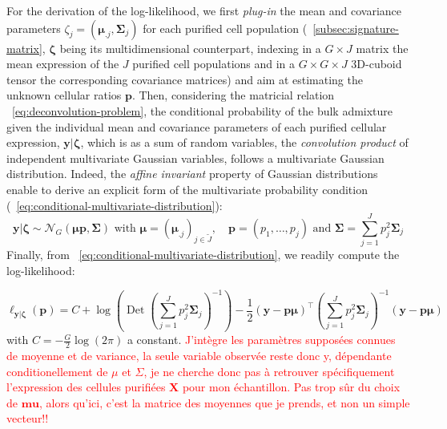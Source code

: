 \documentclass[long, final]{jobim}
\DeclareMathOperator*{\DET}{Det}
\begin{document}
For the derivation of the log-likelihood, we first \textit{plug-in} the mean and covariance parameters $\zeta_j=\left(\boldsymbol{\mu}_{.j}, \boldsymbol{\Sigma}_j\right)$ for each purified cell population (\sectionname~\ref{subsec:signature-matrix}, $\boldsymbol{\zeta}$ being its multidimensional counterpart, indexing in a $G \times J$ matrix the mean expression of the $J$ purified cell populations and in a $G \times G \times J$ 3D-cuboid tensor the corresponding covariance matrices) and aim at estimating the unknown cellular ratios $\boldsymbol{p}$. Then, considering the matricial relation \equationname ~\ref{eq:deconvolution-problem}, the conditional probability of the bulk admixture given the individual mean and covariance parameters of each purified cellular expression, $\boldsymbol{y}|\boldsymbol{\zeta}$, which is as a sum of random variables, the \textit{convolution product} of independent multivariate Gaussian variables, follows a multivariate Gaussian distribution. Indeed, the \textit{affine invariant} property of Gaussian distributions enable to derive an explicit form of the multivariate probability condition (\equationname~\ref{eq:conditional-multivariate-distribution}):
\begin{equation}
\label{eq:conditional-multivariate-distribution}
\boldsymbol{y}|\boldsymbol{\zeta} \sim \mathcal{N}_G(\boldsymbol{\mu} \boldsymbol{p}, \boldsymbol{\Sigma}) \text{ with } \boldsymbol{\mu} = (\boldsymbol{\mu}_{.j})_{j \in \widetilde{J}}, \quad \boldsymbol {p}=(p_1, \ldots, p_j) \text{ and } \boldsymbol{\Sigma}=\sum_{j=1}^J p_{j}^2\boldsymbol{\Sigma}_{j}
\end{equation}
Finally, from \equationname~\ref{eq:conditional-multivariate-distribution}, we readily compute the log-likelihood:

\begin{equation}
\label{eq:loglikelihood-multivariate-gaussian}
\ell_{\boldsymbol{y} | \boldsymbol{\zeta}}(\boldsymbol{p})=C + \log\left(\DET \left(\sum_{j=1}^J p_{j}^2\boldsymbol{\Sigma}_{j}\right)^{-1}\right) - \frac{1}{2} (\boldsymbol{y} - \boldsymbol{p} \boldsymbol{\mu})^\top \left(\sum_{j=1}^J p_{j}^2\boldsymbol{\Sigma}_{j}\right)^{-1} (\boldsymbol{y} - \boldsymbol{p}\boldsymbol{\mu})
\end{equation} with $C=-\frac{G}{2}\log(2\pi)$ a constant. 
\textcolor{red}{J'intègre les paramètres supposées connues de moyenne et de variance, la seule variable observée reste donc y, dépendante conditionellement de $\mu$ et $\Sigma$, je ne cherche donc pas à retrouver spécifiquement l'expression des cellules purifiées $\boldsymbol{X}$ pour mon échantillon. Pas trop sûr du choix de $\boldsymbol{mu}$, alors qu'ici, c'est la matrice des moyennes que je prends, et non un simple vecteur!!}
\end{document}
